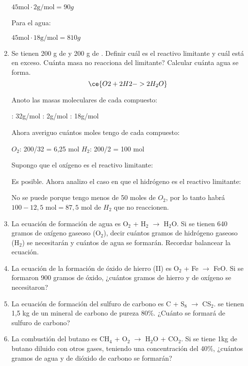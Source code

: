 \begin{enumerate}
$45 \text{mol} \cdot 2\text{g/mol} = 90 g$

Para el agua:

$45 \text{mol} \cdot 18\text{g/mol} = 810g$


\item 
Se tienen 200 g de  y 200 g de .
Definir cuál es el reactivo limitante y cuál está en exceso.
Cuánta masa no reacciona del limitante?
Calcular cuánta agua se forma.
$$\ce{O2 + 2H2 -> 2H_2O}$$

Anoto las masas moleculares de cada compuesto:

\hfil{}: 32g/mol\hfil
{}: 2g/mol\hfil
{}: 18g/mol\hfil

\skipline
Ahora averiguo cuántos moles tengo de cada compuesto:

\hfil$O_2$: 200/32 = 6,25 mol\hfil
$H_2$: 200/2 = 100 mol\hfil

\skipline
Supongo que el oxígeno es el reactivo limitante:

Es posible. Ahora analizo el caso en que el hidrógeno es el reactivo limitante:

No se puede porque tengo menos de 50 moles de $O_2$, por lo tanto habrá $100-12,5 \text{ mol} = 87,5 \text{ mol}$ de $H_2$ que no reaccionen.


\item La ecuación de formación de agua es O$_2$ + H$_2$ $\longrightarrow$ H$_2$O. Si se tienen 640 gramos de oxígeno gaseoso (O$_2$), decir cuántos gramos de hidrógeno gaseoso (H$_2$) se necesitarán y cuántos de agua se formarán. Recordar balancear la ecuación.

\item La ecuación de la formación de óxido de hierro (II) es O$_2$ + Fe $\longrightarrow$ FeO. Si se formaron 900 gramos de óxido, ¿cuántos gramos de hierro y de oxígeno se necesitaron?

\item La ecuación de formación del sulfuro de carbono es C + S$_8$ $\longrightarrow$ CS$_2$. se tienen 1,5 kg de un mineral de carbono de pureza 80\%. ¿Cuánto se formará de sulfuro de carbono?

\item La combustión del butano es CH$_4$ + O$_2$ $\longrightarrow$ H$_2$O + CO$_2$. Si se tiene 1kg de butano diluido con otros gases, teniendo una concentración del 40$\%$, ¿cuántos gramos de agua y de dióxido de carbono se formarán?


\end{enumerate}

